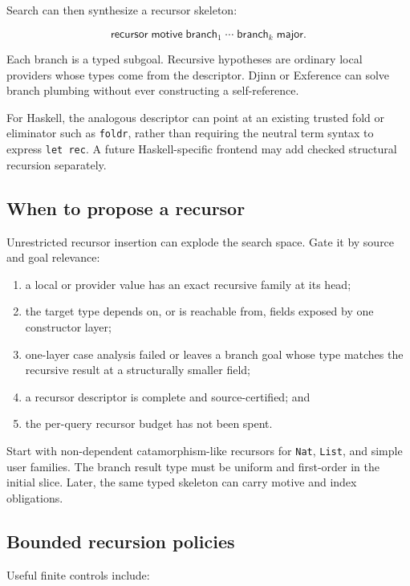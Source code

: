 \documentclass[11pt]{article}
\newcommand{\code}[1]{\texttt{#1}}
\newcommand{\Djinn}{Djinn}
\newcommand{\Exference}{Exference}
\begin{document}
Search can then synthesize a recursor skeleton:

\[
  \mathsf{recursor}\;\mathsf{motive}\;
  \mathsf{branch}_1\;\cdots\;\mathsf{branch}_k\;\mathsf{major}.
\]

Each branch is a typed subgoal.  Recursive hypotheses are ordinary local
providers whose types come from the descriptor.  \Djinn{} or \Exference{} can
solve branch plumbing without ever constructing a self-reference.

For Haskell, the analogous descriptor can point at an existing trusted fold or
eliminator such as \code{foldr}, rather than requiring the neutral term syntax
to express \code{let rec}.  A future Haskell-specific frontend may add checked
structural recursion separately.

\subsection{When to propose a recursor}

Unrestricted recursor insertion can explode the search space.  Gate it by
source and goal relevance:

\begin{enumerate}
  \item a local or provider value has an exact recursive family at its head;
  \item the target type depends on, or is reachable from, fields exposed by one
    constructor layer;
  \item one-layer case analysis failed or leaves a branch goal whose type
    matches the recursive result at a structurally smaller field;
  \item a recursor descriptor is complete and source-certified; and
  \item the per-query recursor budget has not been spent.
\end{enumerate}

Start with non-dependent catamorphism-like recursors for \code{Nat},
\code{List}, and simple user families.  The branch result type must be uniform
and first-order in the initial slice.  Later, the same typed skeleton can carry
motive and index obligations.

\subsection{Bounded recursion policies}

Useful finite controls include:
\end{document}
